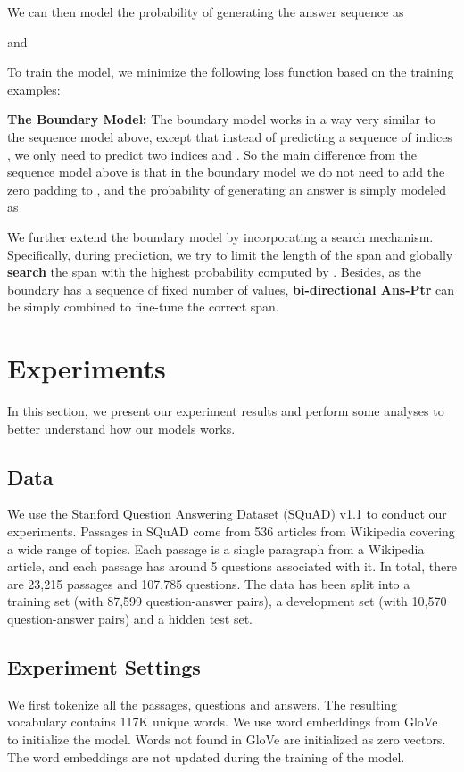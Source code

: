 \documentclass{article} \usepackage{iclr2017_conference,times}
\begin{document}
We can then model the probability of generating the answer sequence as

and


To train the model, we minimize the following loss function based on the training examples:


\noindent \textbf{The Boundary Model:} The boundary model works in a way very similar to the sequence model above, except that instead of predicting a sequence of indices , we only need to predict two indices  and .
So the main difference from the sequence model above is that in the boundary model we do not need to add the zero padding to , and the probability of generating an answer is simply modeled as


We further extend the boundary model by incorporating a search mechanism. 
Specifically, during prediction, we try to limit the length of the span and globally \textbf{search} the span with the highest probability computed by . 
Besides, as the boundary has a sequence of fixed number of values, \textbf{bi-directional Ans-Ptr} can be simply combined to fine-tune the correct span.
 \section{Experiments}

In this section, we present our experiment results and perform some analyses to better understand how our models works.

\subsection{Data}

We use the Stanford Question Answering Dataset (SQuAD) v1.1 to conduct our experiments.
Passages in SQuAD come from 536 articles from Wikipedia covering a wide range of topics.
Each passage is a single paragraph from a Wikipedia article, and each passage has around 5 questions associated with it.
In total, there are 23,215 passages and 107,785 questions.
The data has been split into a training set (with 87,599 question-answer pairs), a development set (with 10,570 question-answer pairs) and a hidden test set.


\subsection{Experiment Settings}

We first tokenize all the passages, questions and answers.
The resulting vocabulary contains 117K unique words.
We use word embeddings from GloVe~\citep{pennington2014glove:emnlp2014} to initialize the model.
Words not found in GloVe are initialized as zero vectors.
The word embeddings are not updated during the training of the model.
\end{document}
